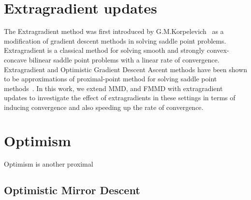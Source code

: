 \section{Extragradient updates}

The Extragradient method was first introduced by
G.M.Korpelevich~\cite{korpelevichextragradient1976} as a modification of gradient descent methods
in solving saddle point problems.
Extragradient is a classical method for solving smooth and strongly convex-concave bilinear saddle
point problems with a linear rate of convergence.
Extragradient and Optimistic Gradient Descent Ascent methods have been shown to be approximations
of proximal-point method for solving saddle point methods~\cite{mokhtariUnified2020}.
In this work, we extend MMD, and FMMD with extragradient updates to investigate the effect of
extragradients in these settings in terms of inducing convergence and also speeding up the rate of
convergence.

\section{Optimism}

Optimism is another proximal

\subsection{Optimistic Mirror Descent}

